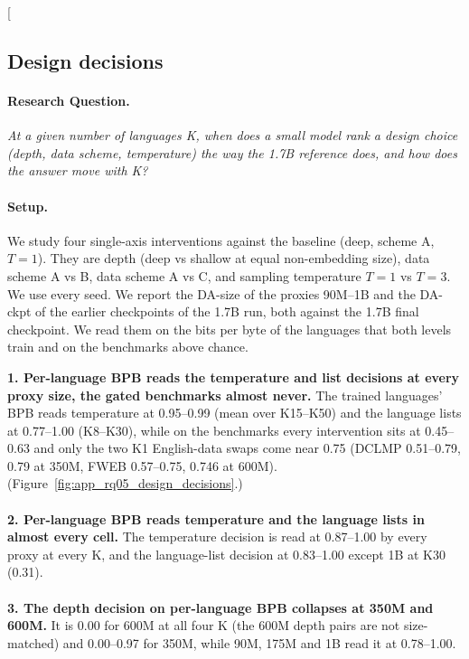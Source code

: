 \clearpage
\twocolumn[{%
\subsection{Design decisions}
\label{app:rq05_design_decisions}

\noindent\begin{minipage}[t]{0.485\textwidth}
\vspace{0pt}
\paragraph{Research Question.} \emph{At a given number of languages K, when does a small model rank a design choice (depth, data scheme, temperature) the way the 1.7B reference does, and how does the answer move with K?}

\paragraph{Setup.} We study four single-axis interventions against the baseline (deep, scheme A, $T = 1$). They are depth (deep vs shallow at equal non-embedding size), data scheme A vs B, data scheme A vs C, and sampling temperature $T = 1$ vs $T = 3$. We use every seed. We report the DA-size of the proxies 90M--1B and the DA-ckpt of the earlier checkpoints of the 1.7B run, both against the 1.7B final checkpoint. We read them on the bits per byte of the languages that both levels train and on the benchmarks above chance.
\end{minipage}\hfill
\begin{minipage}[t]{0.485\textwidth}
\vspace{0pt}
\begin{rqfinding}
\textbf{1. Per-language BPB reads the temperature and list decisions at every proxy size, the gated benchmarks almost never.} The trained languages' BPB reads temperature at 0.95--0.99 (mean over K15--K50) and the language lists at 0.77--1.00 (K8--K30), while on the benchmarks every intervention sits at 0.45--0.63 and only the two K1 English-data swaps come near 0.75 (DCLMP 0.51--0.79, 0.79 at 350M, FWEB 0.57--0.75, 0.746 at 600M). (Figure~\ref{fig:app_rq05_design_decisions}.)
\\
\\
\textbf{2. Per-language BPB reads temperature and the language lists in almost every cell.} The temperature decision is read at 0.87--1.00 by every proxy at every K, and the language-list decision at 0.83--1.00 except 1B at K30 (0.31).
\\
\\
\textbf{3. The depth decision on per-language BPB collapses at 350M and 600M.} It is 0.00 for 600M at all four K (the 600M depth pairs are not size-matched) and 0.00--0.97 for 350M, while 90M, 175M and 1B read it at 0.78--1.00.
\end{rqfinding}
\end{minipage}

}
